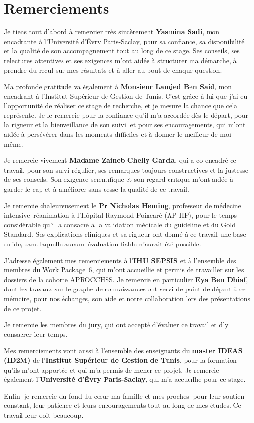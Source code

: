 \chapter*{Remerciements}

Je tiens tout d'abord à remercier très sincèrement \textbf{Yasmina Sadi}, mon encadrante à l'Université d'Évry Paris-Saclay, pour sa confiance, sa disponibilité et la qualité de son accompagnement tout au long de ce stage. Ses conseils, ses relectures attentives et ses exigences m'ont aidée à structurer ma démarche, à prendre du recul sur mes résultats et à aller au bout de chaque question.

Ma profonde gratitude va également à \textbf{Monsieur Lamjed Ben Said}, mon encadrant à l'Institut Supérieur de Gestion de Tunis. C'est grâce à lui que j'ai eu l'opportunité de réaliser ce stage de recherche, et je mesure la chance que cela représente. Je le remercie pour la confiance qu'il m'a accordée dès le départ, pour la rigueur et la bienveillance de son suivi, et pour ses encouragements, qui m'ont aidée à persévérer dans les moments difficiles et à donner le meilleur de moi-même.

Je remercie vivement \textbf{Madame Zaineb Chelly Garcia}, qui a co-encadré ce travail, pour son suivi régulier, ses remarques toujours constructives et la justesse de ses conseils. Son exigence scientifique et son regard critique m'ont aidée à garder le cap et à améliorer sans cesse la qualité de ce travail.

Je remercie chaleureusement le \textbf{Pr Nicholas Heming}, professeur de médecine intensive--réanimation à l'Hôpital Raymond-Poincaré (AP-HP), pour le temps considérable qu'il a consacré à la validation médicale du guideline et du Gold Standard. Ses explications cliniques et sa rigueur ont donné à ce travail une base solide, sans laquelle aucune évaluation fiable n'aurait été possible.

J'adresse également mes remerciements à l'\textbf{IHU SEPSIS} et à l'ensemble des membres du Work Package~6, qui m'ont accueillie et permis de travailler sur les dossiers de la cohorte APROCCHSS. Je remercie en particulier \textbf{Eya Ben Dhiaf}, dont les travaux sur le graphe de connaissances ont servi de point de départ à ce mémoire, pour nos échanges, son aide et notre collaboration lors des présentations de ce projet.

Je remercie les membres du jury, qui ont accepté d'évaluer ce travail et d'y consacrer leur temps.

Mes remerciements vont aussi à l'ensemble des enseignants du \textbf{master IDEAS (ID2M)} de l'\textbf{Institut Supérieur de Gestion de Tunis}, pour la formation qu'ils m'ont apportée et qui m'a permis de mener ce projet. Je remercie également l'\textbf{Université d'Évry Paris-Saclay}, qui m'a accueillie pour ce stage.

Enfin, je remercie du fond du cœur ma famille et mes proches, pour leur soutien constant, leur patience et leurs encouragements tout au long de mes études. Ce travail leur doit beaucoup.
